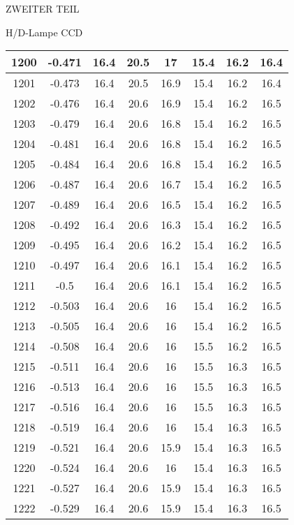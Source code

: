 \begin{appendix}
\begin{chapter}{ZWEITER TEIL}
\begin{section}{H/D-Lampe CCD}
\begin{scriptsize}
\begin{longtable}[htbp]{|c|c|c|c|c|c|c|c|}
            1200 & -0.471 & 16.4 & 20.5 & 17 & 15.4 & 16.2 & 16.4 \\ \hline
            1201 & -0.473 & 16.4 & 20.5 & 16.9 & 15.4 & 16.2 & 16.4 \\ \hline
            1202 & -0.476 & 16.4 & 20.6 & 16.9 & 15.4 & 16.2 & 16.5 \\ \hline
            1203 & -0.479 & 16.4 & 20.6 & 16.8 & 15.4 & 16.2 & 16.5 \\ \hline
            1204 & -0.481 & 16.4 & 20.6 & 16.8 & 15.4 & 16.2 & 16.5 \\ \hline
            1205 & -0.484 & 16.4 & 20.6 & 16.8 & 15.4 & 16.2 & 16.5 \\ \hline
            1206 & -0.487 & 16.4 & 20.6 & 16.7 & 15.4 & 16.2 & 16.5 \\ \hline
            1207 & -0.489 & 16.4 & 20.6 & 16.5 & 15.4 & 16.2 & 16.5 \\ \hline
            1208 & -0.492 & 16.4 & 20.6 & 16.3 & 15.4 & 16.2 & 16.5 \\ \hline
            1209 & -0.495 & 16.4 & 20.6 & 16.2 & 15.4 & 16.2 & 16.5 \\ \hline
            1210 & -0.497 & 16.4 & 20.6 & 16.1 & 15.4 & 16.2 & 16.5 \\ \hline
            1211 & -0.5 & 16.4 & 20.6 & 16.1 & 15.4 & 16.2 & 16.5 \\ \hline
            1212 & -0.503 & 16.4 & 20.6 & 16 & 15.4 & 16.2 & 16.5 \\ \hline
            1213 & -0.505 & 16.4 & 20.6 & 16 & 15.4 & 16.2 & 16.5 \\ \hline
            1214 & -0.508 & 16.4 & 20.6 & 16 & 15.5 & 16.2 & 16.5 \\ \hline
            1215 & -0.511 & 16.4 & 20.6 & 16 & 15.5 & 16.3 & 16.5 \\ \hline
            1216 & -0.513 & 16.4 & 20.6 & 16 & 15.5 & 16.3 & 16.5 \\ \hline
            1217 & -0.516 & 16.4 & 20.6 & 16 & 15.5 & 16.3 & 16.5 \\ \hline
            1218 & -0.519 & 16.4 & 20.6 & 16 & 15.4 & 16.3 & 16.5 \\ \hline
            1219 & -0.521 & 16.4 & 20.6 & 15.9 & 15.4 & 16.3 & 16.5 \\ \hline
            1220 & -0.524 & 16.4 & 20.6 & 16 & 15.4 & 16.3 & 16.5 \\ \hline
            1221 & -0.527 & 16.4 & 20.6 & 15.9 & 15.4 & 16.3 & 16.5 \\ \hline
            1222 & -0.529 & 16.4 & 20.6 & 15.9 & 15.4 & 16.3 & 16.5 \\ \hline

\end{longtable}
\end{scriptsize}
\end{section}
\end{chapter}
\end{appendix}

